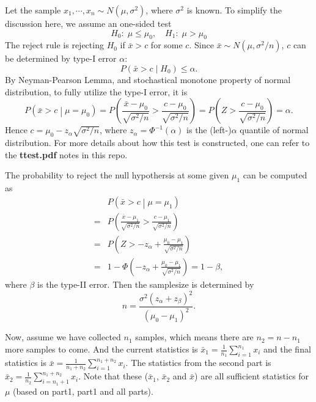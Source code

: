 \documentclass[a4paper,12pt]{article}
\begin{document}
Let the sample $x_1, \cdots, x_n \sim N\left(\mu, \sigma^2\right)$, where $\sigma^2$ is known. To simplify the discussion here, we assume an one-sided test
\[
  H_0:\; \mu \leq \mu_0,\quad H_1:\; \mu > \mu_0
\]
The reject rule is rejecting $H_0$ if $\bar{x} > c$ for some $c$. Since $\bar{x}\sim N\left(\mu, \sigma^2 / n\right)$, $c$ can be determined by type-I error $\alpha$:
\[
  P\left(\bar{x} > c\middle| H_0\right) \leq \alpha
  .
\]
By Neyman-Pearson Lemma, and stochastical monotone property of normal distribution, to fully utilize the type-I error, it is
\[
  P\left(\bar{x} > c \middle| \mu = \mu_0\right)
  = P\left(\frac{\bar{x} - \mu_0}{\sqrt{\sigma^2 / n}}
    > \frac{c - \mu_0}{\sqrt{\sigma^2 / n}}\right)
  = P\left(Z > \frac{c - \mu_0}{\sqrt{\sigma^2 / n}}\right)
  = \alpha
  .
\]
Hence $c = \mu_0 - z_{\alpha}\sqrt{\sigma^2 / n}$, where $z_\alpha = \Phi^{-1}\left(\alpha\right)$ is the (left-)$\alpha$ quantile of normal distribution. For more details about how this test is constructed, one can refer to the \textbf{ttest.pdf} notes in this repo.
\par
The probability to reject the null hypothersis at some given $\mu_1$ can be computed as
\[
  \begin{aligned}
    & P\left(\bar{x} > c\middle| \mu = \mu_1\right)    \\
    =& P\left(\frac{\bar{x} - \mu_1}{\sqrt{\sigma^2 / n}}
      > \frac{c - \mu_1}{\sqrt{\sigma^2 / n}}\right)    \\
    =& P\left(
      Z > -z_{\alpha} + \frac{\mu_0 - \mu_1}{\sqrt{\sigma^2 / n}}\right)    \\
    =& 1 - \Phi\left(-z_{\alpha} + \frac{\mu_0 - \mu_1}{\sqrt{\sigma^2 / n}}\right) = 1 - \beta
    ,
  \end{aligned}
\]
where $\beta$ is the type-II error. Then the samplesize is determined by
\[
  n = \frac{\sigma^2\left(z_{\alpha} + z_{\beta}\right)^2}{\left(\mu_0 - \mu_1\right)^2}.
\]
\par
Now, assume we have collected $n_1$ samples, which means there are $n_2 = n - n_1$ more samples to come. And the current statistics is $\bar{x}_1 = \frac{1}{n_1}\sum\limits_{i = 1}^{n_1}x_i$ and the final statistics is $\bar{x} = \frac{1}{n_1 + n_2}\sum\limits_{i = 1}^{n_1 + n_2}x_i$. The statistics from the second part is $\bar{x}_2 = \frac{1}{n_2}\sum\limits_{i = n_1 + 1}^{n_1 + n_2}x_i$. Note that these ($\bar{x}_1$, $\bar{x}_2$ and $\bar{x}$) are all sufficient statistics for $\mu$ (based on part1, part1 and all parts).
\par
\end{document}
